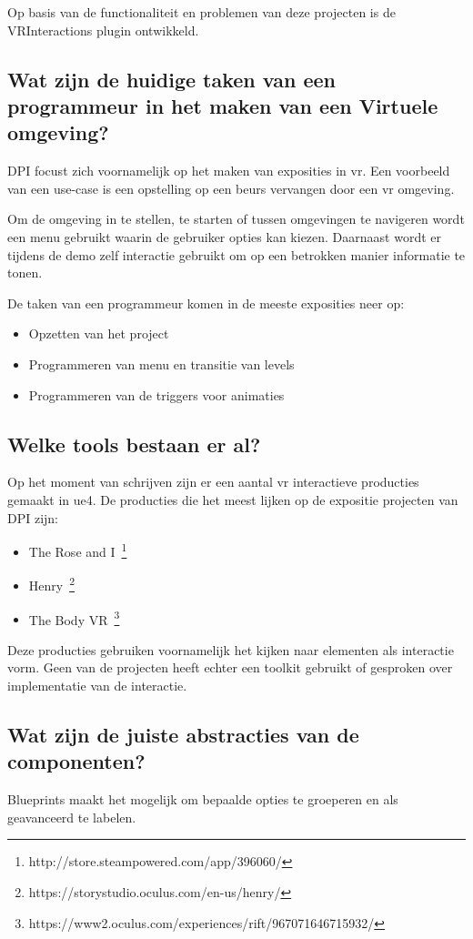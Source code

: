 Op basis van de functionaliteit en problemen van deze projecten is de VRInteractions plugin ontwikkeld.

\subsection{Wat zijn de huidige taken van een programmeur in het maken van een Virtuele omgeving?}
DPI focust zich voornamelijk op het maken van exposities in \gls{vr}. Een voorbeeld van een use-case is een opstelling op een beurs vervangen door een \gls{vr} omgeving.

Om de omgeving in te stellen, te starten of tussen omgevingen te navigeren wordt een menu gebruikt waarin de gebruiker opties kan kiezen. Daarnaast wordt er tijdens de demo zelf interactie gebruikt om op een betrokken manier informatie te tonen. 

De taken van een programmeur komen in de meeste exposities neer op:

\begin{itemize}
	\item Opzetten van het project
	\item Programmeren van menu en transitie van levels
	\item Programmeren van de triggers voor animaties 
\end{itemize}


\subsection{Welke tools bestaan er al?}
Op het moment van schrijven zijn er een aantal \gls{vr} interactieve producties gemaakt in \gls{ue4}. De producties die het meest lijken op de expositie projecten van DPI zijn:
 
\begin{itemize}
	\item The Rose and I~\footnote{http://store.steampowered.com/app/396060/}
	\item Henry~\footnote{https://storystudio.oculus.com/en-us/henry/}
	\item The Body VR~\footnote{https://www2.oculus.com/experiences/rift/967071646715932/}
\end{itemize}

Deze producties gebruiken voornamelijk het kijken naar elementen als interactie vorm. Geen van de projecten heeft echter een toolkit gebruikt of gesproken over implementatie van de interactie.

\subsection{Wat zijn de juiste abstracties van de componenten?}
Blueprints maakt het mogelijk om bepaalde opties te groeperen en als geavanceerd te labelen. 

